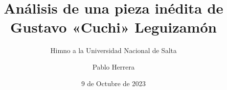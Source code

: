 \documentclass[a5paper,10pt]{scrbook}
\begin{document}
\title{Análisis de una pieza inédita de\\Gustavo «Cuchi» Leguizamón}
\subtitle{Himno a la Universidad Nacional de Salta}
\author{Pablo Herrera}
\date{9 de Octubre de 2023}
\maketitle

\frontmatter
\newpage{\ }

{\footnotesize \tableofcontents}


\mainmatter





\backmatter
\begin{appendices}


\end{appendices}
\listoftables
\listoffigures
\end{document}
